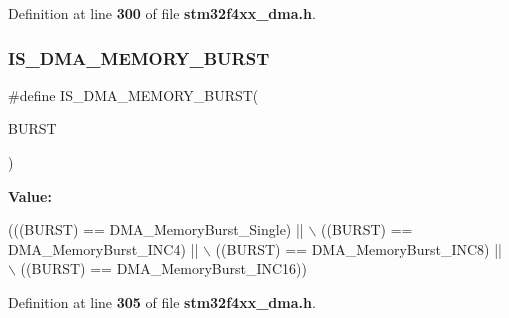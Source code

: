 Definition at line \textbf{ 300} of file \textbf{ stm32f4xx\+\_\+dma.\+h}.

\mbox{\label{group__DMA__memory__burst_ga921ebf06447dc036180fff50b7e4846a}} 
\subsubsection{I\+S\+\_\+\+D\+M\+A\+\_\+\+M\+E\+M\+O\+R\+Y\+\_\+\+B\+U\+R\+ST}
{\footnotesize\ttfamily \#define I\+S\+\_\+\+D\+M\+A\+\_\+\+M\+E\+M\+O\+R\+Y\+\_\+\+B\+U\+R\+ST(\begin{DoxyParamCaption}\item[{}]{B\+U\+R\+ST }\end{DoxyParamCaption})}

{\bfseries Value\+:}
\begin{DoxyCode}
(((BURST) == DMA_MemoryBurst_Single) || \(\backslash\)
                                    ((BURST) == DMA_MemoryBurst_INC4)  || \(\backslash\)
                                    ((BURST) == DMA_MemoryBurst_INC8)  || \(\backslash\)
                                    ((BURST) == DMA_MemoryBurst_INC16))
\end{DoxyCode}


Definition at line \textbf{ 305} of file \textbf{ stm32f4xx\+\_\+dma.\+h}.

